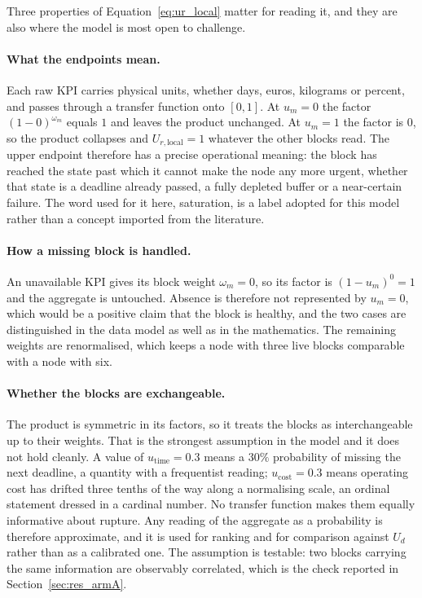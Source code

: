 Three properties of Equation~\ref{eq:ur_local} matter for reading it, and they are also
where the model is most open to challenge.

\paragraph{What the endpoints mean.}
Each raw KPI carries physical units, whether days, euros, kilograms or percent, and passes
through a transfer function onto $[0,1]$. At $u_m = 0$ the factor $(1-0)^{\omega_m}$ equals
$1$ and leaves the product unchanged. At $u_m = 1$ the factor is $0$, so the product collapses
and $U_{r,\text{local}} = 1$ whatever the other blocks read. The upper endpoint therefore has
a precise operational meaning: the block has reached the state past which it cannot make the
node any more urgent, whether that state is a deadline already passed, a fully depleted buffer
or a near-certain failure. The word used for it here, saturation, is a label adopted for this
model rather than a concept imported from the literature.

\paragraph{How a missing block is handled.}
An unavailable KPI gives its block weight $\omega_m = 0$, so its factor is $(1-u_m)^0 = 1$ and
the aggregate is untouched. Absence is therefore not represented by $u_m = 0$, which would be
a positive claim that the block is healthy, and the two cases are distinguished in the data
model as well as in the mathematics. The remaining weights are renormalised, which keeps a
node with three live blocks comparable with a node with six.

\paragraph{Whether the blocks are exchangeable.}
The product is symmetric in its factors, so it treats the blocks as interchangeable up to
their weights. That is the strongest assumption in the model and it does not hold cleanly.
A value of $u_{\text{time}} = 0.3$ means a $30\%$ probability of missing the next deadline, a
quantity with a frequentist reading; $u_{\text{cost}} = 0.3$ means operating cost has drifted
three tenths of the way along a normalising scale, an ordinal statement dressed in a cardinal
number. No transfer function makes them equally informative about rupture. Any reading of the aggregate as a probability is therefore approximate, and it is used
for ranking and for comparison against $U_d$ rather than as a calibrated one. The
assumption is testable: two blocks carrying the same information are observably
correlated, which is the check reported in Section~\ref{sec:res_armA}.

